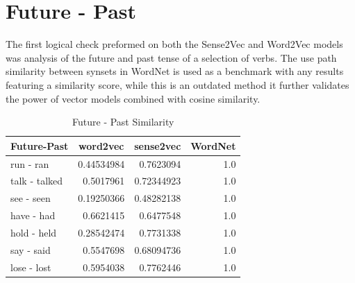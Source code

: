 \section{Future - Past}
The first logical check preformed on both the Sense2Vec and Word2Vec models was analysis of the future and past tense of a selection of verbs. The use path similarity between synsets in WordNet is used as a benchmark with any results featuring a similarity score, while this is an outdated method it further validates the power of vector models combined with cosine similarity.

\begin{table}[h]
\centering
\begin{tabular}{|l|r|r|r|}
\hline
\textbf{Future-Past} & \multicolumn{1}{c|}{\textbf{word2vec}} & \multicolumn{1}{c|}{\textbf{sense2vec}} & \multicolumn{1}{c|}{\textbf{WordNet}} \\ \hline
run - ran            & 0.44534984                             & 0.7623094                               & 1.0                                   \\ \hline
talk - talked        & 0.5017961                              & 0.72344923                              & 1.0                                   \\ \hline
see - seen           & 0.19250366                             & 0.48282138                              & 1.0                                   \\ \hline
have - had           & 0.6621415                              & 0.6477548                               & 1.0                                   \\ \hline
hold - held          & 0.28542474                             & 0.7731338                               & 1.0                                   \\ \hline
say - said           & 0.5547698                              & 0.68094736                              & 1.0                                   \\ \hline
lose - lost          & 0.5954038                              & 0.7762446                               & 1.0                                   \\ \hline
\end{tabular}
\caption{Future - Past Similarity}
\label{Future - Past Similarity}
\end{table}

